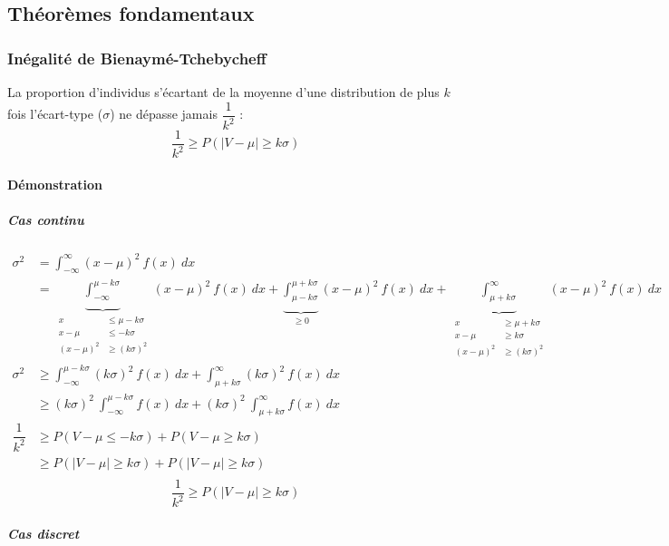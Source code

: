 \newpage
\subsection{Théorèmes fondamentaux}






\subsubsection{Inégalité de Bienaymé-Tchebycheff}
La proportion d'individus s'écartant de la moyenne d'une distribution de plus $k$ fois l'écart-type ($\sigma$) ne dépasse jamais $\dfrac{1}{k^2}$ :
$$\boxed{\dfrac{1}{k^2} \geq P(|V-\mu|\geq k\sigma)}$$
\paragraph{Démonstration}
\subparagraph{Cas continu}
\begin{align*}
	\sigma^2       &= \int_{-\infty}^{\infty} (x-\mu)^2\ f(x)\ dx\\
	               &= \underbrace{\int_{-\infty}^{\mu-k\sigma}}_{\begin{aligned}x&\leq\mu-k\sigma\\x-\mu&\leq -k\sigma\\(x-\mu)^2&\geq(k\sigma)^2\end{aligned}} (x-\mu)^2\ f(x)\ dx + \underbrace{\int_{\mu-k\sigma}^{\mu+k\sigma}}_{\geq0} (x-\mu)^2\ f(x)\ dx + \underbrace{\int_{\mu+k\sigma}^{\infty}}_{\begin{aligned}x&\geq\mu+k\sigma\\x-\mu&\geq k\sigma\\(x-\mu)^2&\geq(k\sigma)^2\end{aligned}} (x-\mu)^2\ f(x)\ dx\\
	\sigma^2       &\geq \int_{-\infty}^{\mu-k\sigma} (k\sigma)^2\ f(x)\ dx + \int_{\mu+k\sigma}^{\infty} (k\sigma)^2\ f(x)\ dx\\
	               &\geq (k\sigma)^2\ \int_{-\infty}^{\mu-k\sigma} f(x)\ dx + (k\sigma)^2\ \int_{\mu+k\sigma}^{\infty} f(x)\ dx\\
	\dfrac{1}{k^2} &\geq P( V - \mu \leq-k\sigma) + P( V - \mu \geq k\sigma)\\
	               &\geq P(|V-\mu|\geq k\sigma) + P(|V-\mu|\geq k\sigma)\\
\end{align*}
$$\boxed{\dfrac{1}{k^2} \geq P(|V-\mu|\geq k\sigma)}$$
\subparagraph{Cas discret}

